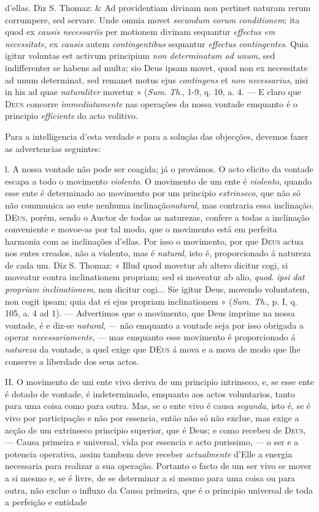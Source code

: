 d'ellas. Diz S. Thomaz: \& Ad providentiam divinam non pertinet naturam rerum corrumpere, sed servare. Unde omnia movet \emph{secundum eorum conditionem}; ita quod ex \emph{causis necessariis} per motionem divinam sequantur \emph{effectus em necessitate}, ex \emph{causis} autem \emph{contingentibus} sequantur \emph{effectus contingentes}. Quia igitur voluntas est activum principium \emph{non determinatum ad unum}, sed indifferenter se habens ad multa; sio Deus ipsam movet, quod non ex necessitate ad unum determinat, sed remanet motus ejus \emph{contingens} et \emph{non necessarius}, nisi in his ad quae \emph{naturaliter} movetur » (\emph{Sum}. \emph{Th}., 1-9, q. 10, a. 4. --- E claro que \textsc{Deus} concorre \emph{immediatamente} nas operações da nossa vontade emquanto é o principio \emph{efficiente} do acto volitivo.\par Para a intelligencia d'esta verdade e para a solução das objecções, devemos fazer as advertencias seguintes:\par l. A nossa vontade não pode ser coagida; já o provámos. O acto elicito da vontade escapa a todo o movimento \emph{violento}. O movimento de um ente é \emph{violento}, quando esse ente é determinado ao movimento por um principio \emph{extrinseco}, que não só não communica ao ente nenhuma inclinação\emph{natural}, mas contraria essa inclinação. \textsc{DEus}, porém, sendo o Auctor de todas as naturezas, confere a todas a inclinação conveniente e movoe-as por tal modo, que o movimento está em perfeita harmonia com as inclinações d'ellas. Por isso o movimento, por que \textsc{Deus} actua nos entes creados, não a violento, mas é \emph{natural}, isto é, proporcionado á natureza de cada um. Diz S. Thomaz: « Illud quod movetur ab altero dicitur cogi, si moveatur contra inclinationem propriam; sed si moveatur ab alio, \emph{quod}. \emph{ipsi dat propriam inclinationem}, non dicitur cogi... Sie igitur Deus, movendo voluntatem, non cogit ipsam; quia dat ei ejus propriam inclinationem » (\emph{Sum}. \emph{Th}., p. I, q. 105, a. 4 ad 1). --- Advertimos que o movimento, que Deus imprime na nossa vontade, é e diz-se \emph{natural}, --- não emquanto a vontade seja por isso obrigada a operar \emph{necessariamente}, --- mas emquanto esse movimento é proporcionado á \emph{natureza} da vontade, a quel exige que \textsc{DEus} á mova e a mova de modo que lhe conserve a liberdade dos seus actos.\par II. O movimento de uni ente vivo deriva de um principio intrinseco, e, se esse ente é dotado de vontade, é indeterminado, emquanto aos actos voluntarios, tanto para uma coisa como para outra. Mas, se o ente vivo é causa \emph{segunda}, isto é, se é vivo por participação e não por essencia, então não só não exclue, mas exige a acção de um extrinseco principio superior, que é Deus; e como recebeu de \textsc{Deus}, --- Causa primeira e universal, vida por essencia e acto purissimo, --- o ser e a potencia operativa, assim tambem deve receber \emph{actualmente} d'Elle a energia necessaria para realizar a sua operação. Portanto o facto de um ser vivo se mover a si mesmo e, se é livre, de se determinar a si mesmo para uma coisa ou para outra, não exclue o influxo da Causa primeira, que é o principio universal de toda a perfeição e entidade 